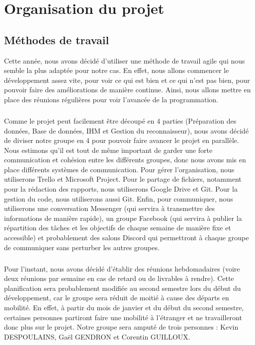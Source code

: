 \chapter{Organisation du projet}

\section{Méthodes de travail}

Cette année, nous avons décidé d’utiliser une méthode de travail agile qui nous
semble la plus adaptée pour notre cas. En effet, nous allons commencer le développement
assez vite, pour voir ce qui est bien et ce qui n’est pas bien, pour pouvoir faire des
améliorations de manière continue. Ainsi, nous allons mettre en place des réunions
régulières pour voir l’avancée de la programmation.

\paragraph{}
Comme le projet peut facilement être découpé en 4 parties (Préparation des données,
Base de données, IHM et Gestion du reconnaisseur), nous avons décidé de diviser notre
groupe en 4 pour pouvoir faire avancer le projet en parallèle. Nous estimons qu’il est
tout de même important de garder une forte communication et cohésion entre les différents
groupes, donc nous avons mis en place différents systèmes de communication. Pour gérer
l’organisation, nous utiliserons Trello et Microsoft Project. Pour le partage de fichiers,
notamment pour la rédaction des rapports, nous utiliserons Google Drive et Git.
Pour la gestion du code, nous utiliserons aussi Git. Enfin, pour communiquer, nous
utiliserons une conversation Messenger (qui servira à transmettre des informations de
manière rapide), un groupe Facebook (qui servira à publier la répartition des tâches et
les objectifs de chaque semaine de manière fixe et accessible) et probablement des salons
Discord qui permettront à chaque groupe de communiquer sans perturber les autres groupes.

\paragraph{}
Pour l’instant, nous avons décidé d’établir des réunions hebdomadaires (voire deux réunions
par semaine en cas de retard ou de livrables à rendre). Cette planification sera probablement
modifiée au second semestre lors du début du développement, car le groupe sera réduit de
moitié à cause des départs en mobilité. En effet, à partir du mois de janvier et du début du
second semestre, certaines personnes partiront faire une mobilité à l’étranger et ne
travailleront donc plus sur le projet. Notre groupe sera amputé de trois personnes : Kevin
DESPOULAINS, Gaël GENDRON et Corentin GUILLOUX.

